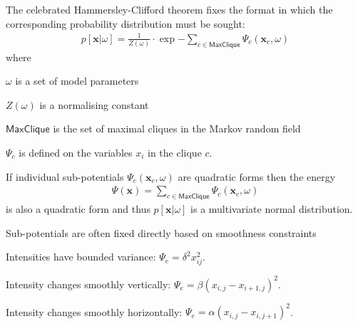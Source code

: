 \documentclass[landscape,footrule]{foils}
\renewcommand{\vec}[1]{\boldsymbol{#1}}
\begin{document}




The celebrated Hammersley-Clifford theorem fixes the format in which the corresponding probability distribution must be sought:
\begin{align*}
p[\vec{x}|\omega]=\frac{1}{Z(\omega)}\cdot\exp{-\sum_{c\in\textsf{MaxClique}}\Psi_c(\vec{x}_c,\omega)} 
\end{align*} 
where 
\begin{triangles}
\item $\omega$ is a set of model parameters
\item $Z(\omega)$ is a normalising constant
\item $\textsf{MaxClique}$ is the set of maximal cliques in the Markov random field
\item $\Psi_c$ is defined on the variables $x_i$ in the clique $c$. 
\end{triangles}


If individual sub-potentials $\Psi_c(\vec{x}_c,\omega)$ are quadratic forms then the energy 
\begin{align*}
\Psi(\vec{x})=\sum_{c\in\textsf{MaxClique}}\Psi_c(\vec{x}_c,\omega) 
\end{align*} 
is also a quadratic form and thus $p[\vec{x}|\omega]$ is a multivariate normal distribution.\vspace*{1cm}

Sub-potentials are often fixed directly based on smoothness constraints
\begin{triangles}
\item Intensities have bounded variance: $\Psi_e=\delta^2 x_{ij}^2$. 
\item Intensity changes smoothly vertically: $\Psi_e=\beta(x_{i,j}-x_{i+1,j})^2$.
\item Intensity changes smoothly horizontally: $\Psi_e=\alpha(x_{i,j}-x_{i,j+1})^2$.
\end{triangles} 


\vspace*{-0.6cm}
\end{document}
